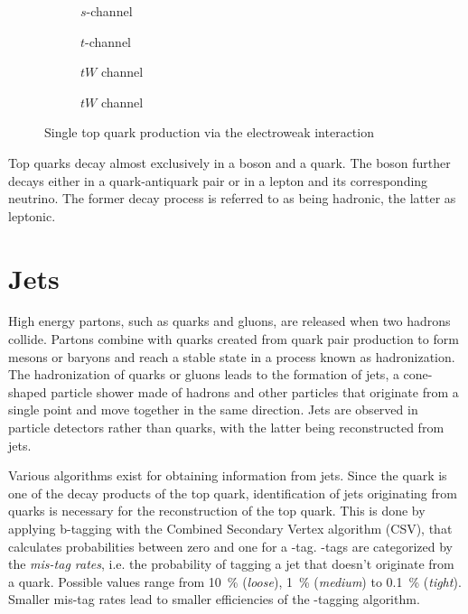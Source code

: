 \begin{figure}[h]
    \centering
    \begin{subfigure}[b]{0.2\textwidth}
        \centering
        
        \caption{$s$-channel}
        \label{fig:top_single_s}
    \end{subfigure}\hfill
    \begin{subfigure}[b]{0.2\textwidth}
        \centering
        
        \caption{$t$-channel}
        \label{fig:top_single_t}
    \end{subfigure}\hfill
    \begin{subfigure}[b]{0.2\textwidth}
        \centering
        
        \caption{$tW$ channel}
        \label{fig:top_single_tw_1}
    \end{subfigure}\hfill
    \begin{subfigure}[b]{0.2\textwidth}
        \centering
        \vfill
        
        \caption{$tW$ channel}
        \label{fig:top_single_tw_2}
    \end{subfigure}
    \caption{Single top quark production via the electroweak interaction}
    \label{fig:top_single}
\end{figure}

Top quarks decay almost exclusively in a \PW boson and a \Pbottom quark. The boson further decays either in a quark-antiquark pair or in a lepton and its corresponding neutrino. The former decay process is referred to as being hadronic, the latter as leptonic.

\section{Jets}
High energy partons, such as quarks and gluons, are released when two hadrons collide. Partons combine with quarks created from quark pair production to form mesons or baryons and reach a stable state in a process known as hadronization. The hadronization of quarks or gluons leads to the formation of jets, a cone-shaped particle shower made of hadrons and other particles that originate from a single point and move together in the same direction. Jets are observed in particle detectors rather than quarks, with the latter being reconstructed from jets.

Various algorithms exist for obtaining information from jets. Since the \Pbottom quark is one of the decay products of the top quark, identification of jets originating from \Pbottom quarks is necessary for the reconstruction of the top quark. This is done by applying b-tagging with the Combined Secondary Vertex algorithm (CSV), that calculates probabilities between zero and one for a \Pbottom-tag. \Pbottom-tags are categorized by the \emph{mis-tag rates}, i.e. the probability of tagging a jet that doesn't originate from a \Pbottom quark. Possible values range from \SI{10}{\%} (\emph{loose}), \SI{1}{\%} (\emph{medium}) to \SI{0.1}{\%} (\emph{tight}). Smaller mis-tag rates lead to smaller efficiencies of the \Pbottom-tagging algorithm.